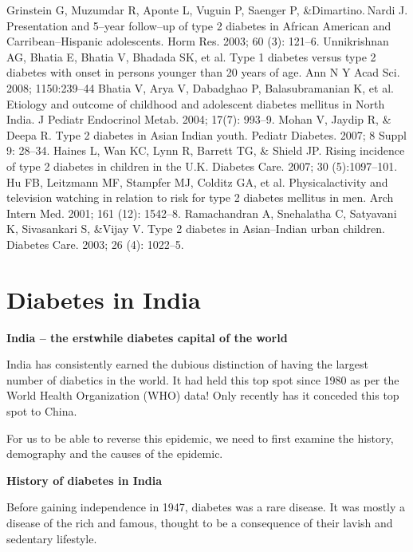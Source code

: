 \begin{thebibliography}{99}
 Grinstein G, Muzumdar R, Aponte L, Vuguin P, Saenger P, \&\break Dimartino. Nardi J. Presentation and 5–year follow–up of type 2 diabetes in African American and Carribean–Hispanic adole\-scents. Horm Res. 2003; 60 (3): 121–6.
  Unnikrishnan AG, Bhatia E, Bhatia V, Bhadada SK, et al. Type 1 dia\-betes versus type 2 diabetes with onset in persons younger than 20 years of age. Ann N Y Acad Sci. 2008; 1150:239–44
  Bhatia V, Arya V, Dabadghao P, Balasubramanian K, et al. Etio\-logy and outcome of childhood and adolescent diabetes mellitus in North India. J Pediatr Endocrinol Metab. 2004; 17(7): 993–9.
  Mohan V, Jaydip R, \& Deepa R. Type 2 diabetes in Asian Indian youth. Pediatr Diabetes. 2007; 8 Suppl 9: 28–34.
  Haines L, Wan KC, Lynn R, Barrett TG, \& Shield JP. Rising incidence of type 2 diabetes in children in the U.K. Diabetes Care. 2007; 30 (5):1097–101.
  Hu FB, Leitzmann MF, Stampfer MJ, Colditz GA, et al. Physical\break activity and television watching in relation to risk for type 2 diabetes mellitus in men. Arch Intern Med. 2001; 161 (12): 1542–8.
  Ramachandran A, Snehalatha C, Satyavani K, Sivasankari S, \&\break Vijay V. Type 2 diabetes in Asian–Indian urban children. Diabetes Care. 2003; 26 (4): 1022–5.
 \end{thebibliography}


\chapter{Diabetes in India}\label{chap8}

\noindent\textbf{India – the erstwhile diabetes capital of the world}

India has consistently earned the dubious distinction of having the largest number of diabetics in the world. It had held this top spot since 1980 as per the World Health Organization (WHO) data! Only recently has it conceded this top spot to China.

For us to be able to reverse this epidemic, we need to first examine the history, demography and the causes of the epidemic.

\noindent\textbf{History of diabetes in India}

Before gaining independence in 1947, diabetes was a rare disease. It was mostly a disease of the rich and famous, thought to be a con\-sequence of their lavish and sedentary lifestyle.

